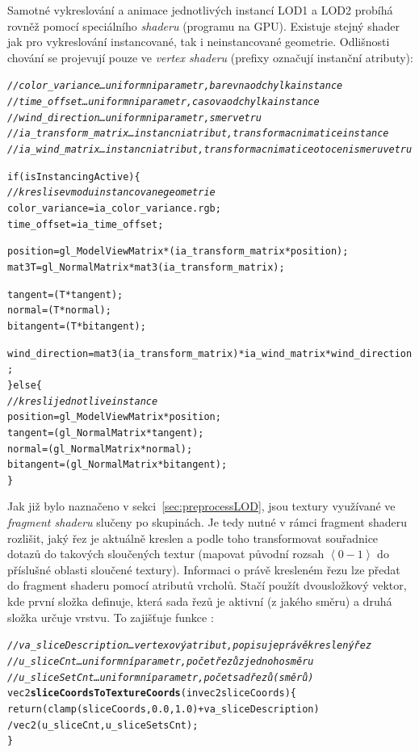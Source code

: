 \pagebreak
Samotné vykreslování a animace jednotlivých instancí LOD1 a LOD2 probíhá rovněž pomocí speciálního \emph{shaderu} (programu na GPU). Existuje stejný shader jak pro vykreslování instancované, tak i neinstancované geometrie. Odlišnosti chování se projevují pouze ve \emph{vertex shaderu} (prefixy  označují instanční atributy):
\begin{alltt}
\textit{// color_variance\dots uniformni parametr, barevna odchylka instance}
\textit{// time_offset\dots uniformni parametr, casova odchylka instance}
\textit{// wind_direction\dots uniformni parametr, smer vetru}
\textit{// ia_transform_matrix\dots instancni atribut, transformacni matice instance}
\textit{// ia_wind_matrix\dots instancni atribut, transformacni matice otoceni smeru vetru}

if (isInstancingActive)\{
    \textit{// kresli se v modu instancovane geometrie}
    color_variance = ia_color_variance.rgb;
    time_offset    = ia_time_offset;
  
    position = gl_ModelViewMatrix * (ia_transform_matrix * position);
    mat3 T   = gl_NormalMatrix * mat3(ia_transform_matrix);
		
    tangent    = ( T * tangent );
    normal     = ( T * normal ); 
    bitangent	 = ( T * bitangent );

    wind_direction = mat3(ia_transform_matrix) * ia_wind_matrix * wind_direction;
\} else \{
    \textit{// kresli jednotlive instance}
    position   = gl_ModelViewMatrix * position;
    tangent    = ( gl_NormalMatrix * tangent );
    normal     = ( gl_NormalMatrix * normal );		
    bitangent  = ( gl_NormalMatrix * bitangent );
\}
\end{alltt}
Jak již bylo naznačeno v sekci~\ref{sec:preprocessLOD}, jsou textury využívané ve \emph{fragment shaderu} slučeny po skupinách. Je tedy nutné v rámci fragment shaderu rozlišit, jaký řez je aktuálně kreslen a podle toho transformovat souřadnice dotazů do takových sloučených textur (mapovat původní rozsah $\left< 0-1 \right >$ do příslušné oblasti sloučené textury). Informaci o právě kresleném řezu lze předat do fragment shaderu pomocí atributů vrcholů. Stačí použít dvousložkový vektor, kde první složka definuje, která sada řezů je aktivní (z jakého směru) a druhá složka určuje vrstvu. To zajišťuje funkce :
\begin{alltt}
\textit{// va_sliceDescription\dots vertexový atribut, popisuje právě kreslený řez }
\textit{// u_sliceCnt\dots uniformní parametr, počet řezů z jednoho směru }
\textit{// u_sliceSetCnt\dots uniformní parametr, počet sad řezů (směrů) }
vec2 {\bf sliceCoordsToTextureCoords}(in vec2 sliceCoords)\{
  return ( clamp ( sliceCoords, 0.0, 1.0 ) + va_sliceDescription) 
            / vec2( u_sliceCnt , u_sliceSetsCnt );
\}
\end{alltt}

